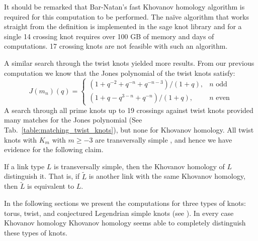 It should be remarked that Bar-Natan's fast Khovanov homology algorithm is
required for this computation to be performed. The na\"{i}ve algorithm that
works straight from the definition is implemented in the sage knot library
\cite{sage} and for a single 14 crossing knot requires over 100 GB of memory
and days of computations. 17 crossing knots are not feasible with such an
algorithm.
\par\hfill\par
A similar search through the twist knots yielded more results.
From our previous computation we know that the Jones polynomial of the twist
knots satisfy:
\begin{equation}
    J(m_{n})(q)=
    \begin{cases}
        (1+q^{-2}+q^{-n}+q^{-n-3})/(1+q),&n\textrm{ odd}\\
        (1+q-q^{3-n}+q^{-n})/(1+q),&n\textrm{ even}
    \end{cases}
\end{equation}
A search through all prime knots up to 19 crossings against twist knots
provided many matches for the Jones polynomial
(See Tab.~\ref{table:matching_twist_knots}), but
none for Khovanov homology. All twist knots with $K_{m}$ with
$m\geq{-3}$ are transversally simple
\cite{EtnyreEtAlLegendrianAndTransverseTwistKnots}, and hence we have evidence
for the following claim.
\begin{conjecture}
    If a link type $L$ is transversally simple, then the Khovanov
    homology of $L$ distinguish it. That is, if $\tilde{L}$
    is another link with the same Khovanov homology, then $\tilde{L}$ is
    equivalent to $L$.
\end{conjecture}
In the following sections we present the computations for three types of knots:
torus, twist, and conjectured Legendrian simple knots
(see \cite{LegendrianKnotAtlas}). In every case Khovanov homology Khovanov
homology seems able to completely distinguish these types of knots.
